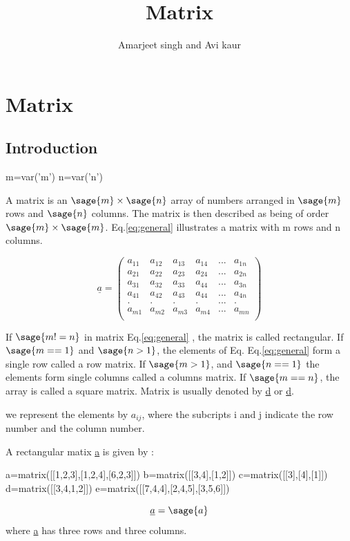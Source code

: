 \documentclass[12pt]{report}
\title{\textbf{Matrix}}
\author{Amarjeet singh and Avi kaur}
\newcommand{\lab}[1]{
Eq.\ref{#1}
}
\begin{document}
\begin{titlepage}
\maketitle
\end{titlepage}
\chapter{Matrix}
\section{Introduction}
\begin{sagesilent}
m=var('m')
n=var('n')
\end{sagesilent}

A matrix is an $\sage{m} \times \sage{n}$  array of numbers arranged in $\sage{m}$ rows and $\sage{n}$ columns. The matrix is then described as being of order $\sage{m} \times \sage{m}$. \lab{eq:general} illustrates a matrix with m rows and n columns.


\begin{equation}
\underline{a}=\left(\begin{array}{rrrrrr}
a_{11} & a_{12} & a_{13} & a_{14} & ... & a_{1n} \\
a_{21} & a_{22} & a_{23} & a_{24} & ... & a_{2n} \\
a_{31} & a_{32} & a_{33} & a_{44} & ... & a_{3n} \\
a_{41} & a_{42} & a_{43} & a_{44} & ... & a_{4n} \\
.     & .     & .     & .     & ... & .     \\
a_{m1} & a_{m2} & a_{m3} & a_{m4} & ... & a_{mn} \\
\end{array}\right) \label{eq:general}          
\end{equation}


If $\sage{m!=n}$ in matrix \lab{eq:general}, the matrix is called rectangular. If $\sage{m==1}$ and $\sage{n>1}$, the elements of Eq.\lab{eq:general} form a single row called a row matrix. If $\sage{m>1}$, and $\sage{n==1}$ the elements form single columns called a columns matrix. If $\sage{m==n}$, the array is called a square matrix.
Matrix is usually denoted by \underline{d} or \underline{d}.

we represent the elements by $a_{{ij}}$, where the subcripts i and j indicate the row number and the column number.

A rectangular matix \underline{a} is given by : 
\begin{sagesilent}
a=matrix([[1,2,3],[1,2,4],[6,2,3]])
b=matrix([[3,4],[1,2]])
c=matrix([[3],[4],[1]])
d=matrix([[3,4,1,2]])
e=matrix([[7,4,4],[2,4,5],[3,5,6]])
\end{sagesilent}
\begin{equation}
\underline{a}=\sage{a}
\label{eq:rectangle}
\end{equation}
where \underline{a} has three rows and three columns.
\end{document}

